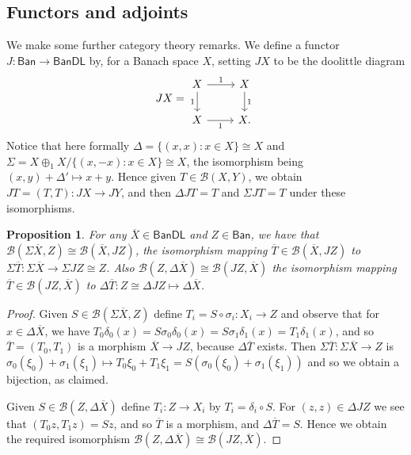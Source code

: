 \documentclass[a4paper,11pt]{article}
\theoremstyle{plain}
\newtheorem{proposition}{Proposition}[section]
\theoremstyle{remark}
\newcommand{\mc}[1]{\mathcal{#1}}
\newcommand{\msf}[1]{\mathsf{#1}}
\begin{document}
\subsection{Functors and adjoints}

We make some further category theory remarks.  We define a functor $J\colon \msf{Ban} \to \msf{BanDL}$ by, for a Banach space $X$, setting $JX$ to be the doolittle diagram
\[ JX = \begin{tikzcd}
X \arrow[r, "1"] \arrow[d, "1"'] & X \arrow[d, "1"] \\
X \arrow[r, "1"'] & X.
\end{tikzcd} \]
Notice that here formally $\Delta = \{ (x,x) : x\in X \} \cong X$ and $\Sigma = X\oplus_1 X / \{ (x,-x) : x\in X \} \cong X$, the isomorphism being $(x,y) +\Delta' \mapsto x+y$.  Hence given $T\in\mc B(X,Y)$, we obtain $JT =(T,T) \colon JX \to JY$, and then $\Delta JT = T$ and $\Sigma JT = T$ under these isomorphisms.

\begin{proposition}\label{prop:J_hom_space_adjoints}
For any $\overline X\in\msf{BanDL}$ and $Z\in\msf{Ban}$, we have that $\mc B(\Sigma\overline X, Z) \cong \mc B(\overline X, JZ)$, the isomorphism mapping $\overline T\in\mc B(\overline X, JZ)$ to $\Sigma\overline T \colon \Sigma\overline X \to \Sigma JZ\cong Z$.  Also $\mc B(Z, \Delta\overline X) \cong \mc B(JZ, \overline X)$ the isomorphism mapping $\overline T \in \mc B(JZ, \overline X)$ to $\Delta\overline T \colon Z \cong \Delta JZ \mapsto \Delta\overline X$.
\end{proposition}
\begin{proof}
Given $S\in\mc B(\Sigma\overline X, Z)$ define $T_i = S\circ \sigma_i \colon X_i \to Z$ and observe that for $x\in\Delta\overline X$, we have $T_0\delta_0(x) = S \sigma_0\delta_0(x) = S\sigma_1\delta_1(x) = T_1\delta_1(x)$, and so $\overline T=(T_0,T_1)$ is a morphism $\overline X \to JZ$, because $\Delta\overline T$ exists.  Then $\Sigma\overline T \colon \Sigma\overline X \to Z$ is $\sigma_0(\xi_0) + \sigma_1(\xi_1) \mapsto T_0\xi_0 + T_1\xi_1 = S(\sigma_0(\xi_0) + \sigma_1(\xi_1))$ and so we obtain a bijection, as claimed.

Given $S\in\mc B(Z,\Delta\overline X)$ define $T_i\colon Z\to X_i$ by $T_i = \delta_i\circ S$.  For $(z,z)\in \Delta JZ$ we see that $(T_0z, T_1z) = Sz$, and so $\overline T$ is a morphism, and $\Delta\overline T = S$.  Hence we obtain the required isomorphism $\mc B(Z, \Delta\overline X) \cong \mc B(JZ, \overline X)$.
\end{proof}
\end{document}
